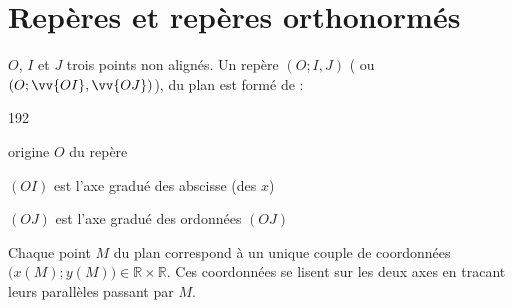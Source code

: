 \documentclass[main.tex]{subfiles}
\begin{document}
%	 
\newpage 
\section{Repères et repères orthonormés} 
$O$, $I$ et $J$ trois points non alignés.
Un repère  $(O;I,J)$ ( ou $(O; \vv{OI}, \vv{OJ})$), du plan est formé de :
\begin{dingautolist}{192}
	\item origine $O$ du repère
	\item $(OI)$ est l'axe gradué des abscisse  (des $x$)
	\item $(OJ)$ est l'axe gradué des ordonnées $(OJ)$
\end{dingautolist}
Chaque point $M$ du plan correspond à un unique couple de coordonnées $\big(x(M); y(M)\big)\in\mathbb{R}\times\mathbb{R}$. Ces coordonnées se lisent sur les deux axes en tracant leurs parallèles passant par $M$.
\end{document}
